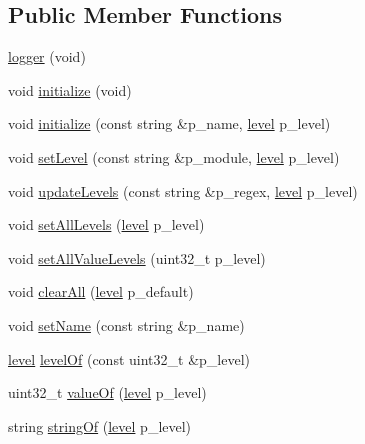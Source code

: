 \subsection*{Public Member Functions}
\begin{DoxyCompactItemize}
\item 
\hyperlink{classxtd_1_1logger_a794da1cd7618a6796d639d11845f9006}{logger} (void)
\item 
void \hyperlink{classxtd_1_1logger_a586ddfe34d0f2c1343385f8034ef9b66}{initialize} (void)
\item 
void \hyperlink{classxtd_1_1logger_a8559c9744e68ecab37076d8744499c8f}{initialize} (const string \&p\+\_\+name, \hyperlink{classxtd_1_1logger_a250ce2f143da181d7149a1556da2a6f1}{level} p\+\_\+level)
\item 
void \hyperlink{classxtd_1_1logger_a9002910ed99cdc1df062c39e385cd379}{set\+Level} (const string \&p\+\_\+module, \hyperlink{classxtd_1_1logger_a250ce2f143da181d7149a1556da2a6f1}{level} p\+\_\+level)
\item 
void \hyperlink{classxtd_1_1logger_af88d4c20247cb62433e660ab7f9f5a97}{update\+Levels} (const string \&p\+\_\+regex, \hyperlink{classxtd_1_1logger_a250ce2f143da181d7149a1556da2a6f1}{level} p\+\_\+level)
\item 
void \hyperlink{classxtd_1_1logger_aeffebbe5b6a43f814c0a1251b6069f26}{set\+All\+Levels} (\hyperlink{classxtd_1_1logger_a250ce2f143da181d7149a1556da2a6f1}{level} p\+\_\+level)
\item 
void \hyperlink{classxtd_1_1logger_a10ec7455d964067fc1ca79f3a7cc14b4}{set\+All\+Value\+Levels} (uint32\+\_\+t p\+\_\+level)
\item 
void \hyperlink{classxtd_1_1logger_a18cd978561fcaf48e2fc935331834fe9}{clear\+All} (\hyperlink{classxtd_1_1logger_a250ce2f143da181d7149a1556da2a6f1}{level} p\+\_\+default)
\item 
void \hyperlink{classxtd_1_1logger_a314e15f9d6eeeafbcf93b2bb757e2143}{set\+Name} (const string \&p\+\_\+name)
\item 
\hyperlink{classxtd_1_1logger_a250ce2f143da181d7149a1556da2a6f1}{level} \hyperlink{classxtd_1_1logger_afa70268de8cc055f4903a54fa61c52df}{level\+Of} (const uint32\+\_\+t \&p\+\_\+level)
\item 
uint32\+\_\+t \hyperlink{classxtd_1_1logger_a615e10d21938ff8681a98894aa31490e}{value\+Of} (\hyperlink{classxtd_1_1logger_a250ce2f143da181d7149a1556da2a6f1}{level} p\+\_\+level)
\item 
string \hyperlink{classxtd_1_1logger_a791f6ccde4fa459cf05085d9b7a0f2d5}{string\+Of} (\hyperlink{classxtd_1_1logger_a250ce2f143da181d7149a1556da2a6f1}{level} p\+\_\+level)

\end{DoxyCompactItemize}
